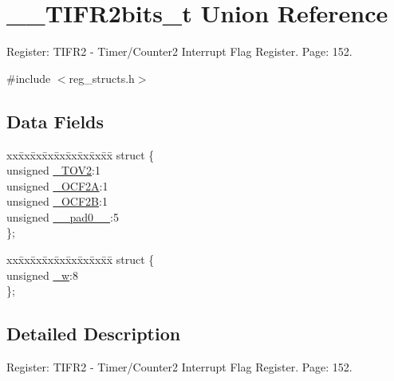 \hypertarget{union_____t_i_f_r2bits__t}{\section{\+\_\+\+\_\+\+T\+I\+F\+R2bits\+\_\+t Union Reference}
\label{union_____t_i_f_r2bits__t}
}


Register\+: T\+I\+F\+R2 -\/ Timer/\+Counter2 Interrupt Flag Register. Page\+: 152.  




{\ttfamily \#include $<$reg\+\_\+structs.\+h$>$}

\subsection*{Data Fields}
\begin{DoxyCompactItemize}
\item 
\begin{tabbing}
xx\=xx\=xx\=xx\=xx\=xx\=xx\=xx\=xx\=\kill
struct \{\\
\>unsigned \hyperlink{union_____t_i_f_r2bits__t_a8d2d3d63bb9064fd6b07d75875218d34}{\_TOV2}:1\\
\>unsigned \hyperlink{union_____t_i_f_r2bits__t_a7aa8916f040bb31cb4394c23ac909e12}{\_OCF2A}:1\\
\>unsigned \hyperlink{union_____t_i_f_r2bits__t_afa2d8e193385142d74e6c9451a0b1af9}{\_OCF2B}:1\\
\>unsigned \hyperlink{union_____t_i_f_r2bits__t_a14c9d27da086f1f8f98f120fb3782c6f}{\_\_pad0\_\_}:5\\
\}; \\

\end{tabbing}\item 
\begin{tabbing}
xx\=xx\=xx\=xx\=xx\=xx\=xx\=xx\=xx\=\kill
struct \{\\
\>unsigned \hyperlink{union_____t_i_f_r2bits__t_a08e241120284ad21d1a2891dbc90b052}{\_w}:8\\
\}; \\

\end{tabbing}\end{DoxyCompactItemize}


\subsection{Detailed Description}
Register\+: T\+I\+F\+R2 -\/ Timer/\+Counter2 Interrupt Flag Register. Page\+: 152. 

